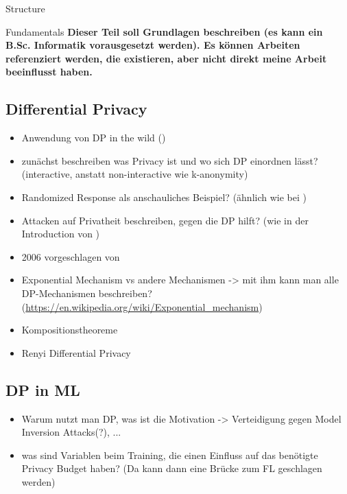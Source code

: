 \begin{chapter}{Structure}
	\begin{section}{Fundamentals}
		\textbf{Dieser Teil soll Grundlagen beschreiben (es kann ein B.Sc. Informatik vorausgesetzt werden). Es können Arbeiten referenziert werden, die existieren, aber nicht direkt meine Arbeit beeinflusst haben.}
		
		\subsection{Differential Privacy}
		\begin{itemize}
			\item Anwendung von DP in the wild (\cite{erlingsson:2014, tezapsidis:2017, apple:2017})
			\item zunächst beschreiben was Privacy ist und wo sich DP einordnen lässt? (interactive, anstatt non-interactive wie k-anonymity)
			\item Randomized Response als anschauliches Beispiel? (ähnlich wie bei \cite[p.1]{erlingsson:2014})
			\item Attacken auf Privatheit beschreiben, gegen die DP hilft? (wie in der Introduction von \cite{abadi:2016})
			\item 2006 vorgeschlagen von \cite{dwork:2006}
			\item Exponential Mechanism vs andere Mechanismen -> mit ihm kann man alle DP-Mechanismen beschreiben? (\url{https://en.wikipedia.org/wiki/Exponential_mechanism})
			\item Kompositionstheoreme
			\item Renyi Differential Privacy\cite{mironov:2017}
		\end{itemize}
		
		\subsection{DP in ML}
		\begin{itemize}
			\item Warum nutzt man DP, was ist die Motivation -> Verteidigung gegen Model Inversion Attacks(?), ...
			\item was sind Variablen beim Training, die einen Einfluss auf das benötigte Privacy Budget haben? (Da kann dann eine Brücke zum FL geschlagen werden)
		\end{itemize}
		

\end{section}
\end{chapter}
